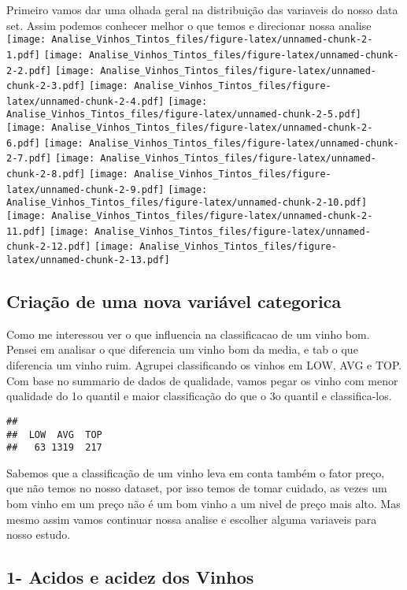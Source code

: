 \documentclass[]{article}
\begin{document}
Primeiro vamos dar uma olhada geral na distribuição das variaveis do
nosso data set. Assim podemos conhecer melhor o que temos e direcionar
nossa analise
\texttt{[image: Analise\_Vinhos\_Tintos\_files/figure-latex/unnamed-chunk-2-1.pdf]}
\texttt{[image: Analise\_Vinhos\_Tintos\_files/figure-latex/unnamed-chunk-2-2.pdf]}
\texttt{[image: Analise\_Vinhos\_Tintos\_files/figure-latex/unnamed-chunk-2-3.pdf]}
\texttt{[image: Analise\_Vinhos\_Tintos\_files/figure-latex/unnamed-chunk-2-4.pdf]}
\texttt{[image: Analise\_Vinhos\_Tintos\_files/figure-latex/unnamed-chunk-2-5.pdf]}
\texttt{[image: Analise\_Vinhos\_Tintos\_files/figure-latex/unnamed-chunk-2-6.pdf]}
\texttt{[image: Analise\_Vinhos\_Tintos\_files/figure-latex/unnamed-chunk-2-7.pdf]}
\texttt{[image: Analise\_Vinhos\_Tintos\_files/figure-latex/unnamed-chunk-2-8.pdf]}
\texttt{[image: Analise\_Vinhos\_Tintos\_files/figure-latex/unnamed-chunk-2-9.pdf]}
\texttt{[image: Analise\_Vinhos\_Tintos\_files/figure-latex/unnamed-chunk-2-10.pdf]}
\texttt{[image: Analise\_Vinhos\_Tintos\_files/figure-latex/unnamed-chunk-2-11.pdf]}
\texttt{[image: Analise\_Vinhos\_Tintos\_files/figure-latex/unnamed-chunk-2-12.pdf]}
\texttt{[image: Analise\_Vinhos\_Tintos\_files/figure-latex/unnamed-chunk-2-13.pdf]}

\hypertarget{criacao-de-uma-nova-variavel-categorica}{%
\subsection{Criação de uma nova variável
categorica}\label{criacao-de-uma-nova-variavel-categorica}}

Como me interessou ver o que influencia na classificacao de um vinho
bom. Pensei em analisar o que diferencia um vinho bom da media, e tab o
que diferencia um vinho ruim. Agrupei classificando os vinhos em LOW,
AVG e TOP. Com base no summario de dados de qualidade, vamos pegar os
vinho com menor qualidade do 1o quantil e maior classificação do que o
3o quantil e classifica-los.

\begin{verbatim}
## 
##  LOW  AVG  TOP 
##   63 1319  217
\end{verbatim}

Sabemos que a classificação de um vinho leva em conta também o fator
preço, que não temos no nosso dataset, por isso temos de tomar cuidado,
as vezes um bom vinho em um preço não é um bom vinho a um nivel de preço
mais alto. Mas mesmo assim vamos continuar nossa analise e escolher
alguma variaveis para nosso estudo.

\hypertarget{acidos-e-acidez-dos-vinhos}{%
\subsection{1- Acidos e acidez dos
Vinhos}\label{acidos-e-acidez-dos-vinhos}}
\end{document}
